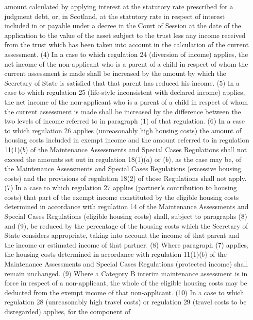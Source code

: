 \documentclass[a4paper]{article}
\begin{document}
amount calculated by applying interest at the statutory rate prescribed for a
judgment debt, or, in Scotland, at the statutory rate in respect of interest
included in or payable under a decree in the Court of Session at the date of the
application to the value of the asset subject to the trust less any income
received from the trust which has been taken into account in the calculation of
the current assessment.
(4) In a case to which regulation 24 (diversion of income) applies, the net
income of the non-applicant who is a parent of a child in respect of whom the
current assessment is made shall be increased by the amount by which the
Secretary of State is satisfied that that parent has reduced his income.
(5) In a case to which regulation 25 (life-style inconsistent with declared
income) applies, the net income of the non-applicant who is a parent of a child
in respect of whom the current assessment is made shall be increased by the
difference between the two levels of income referred to in paragraph (1) of that
regulation.
(6) In a case to which regulation 26 applies (unreasonably high housing costs)
the amount of housing costs included in exempt income and the amount referred to
in regulation 11(1)($b$) of the Maintenance Assessments and Special Cases
Regulations shall not exceed the amounts set out in regulation 18(1)($a$) or ($b$),
as the case may be, of the Maintenance Assessments and Special Cases Regulations
(excessive housing costs) and the provisions of regulation 18(2) of those
Regulations shall not apply.
(7) In a case to which regulation 27 applies (partner’s contribution to housing
costs) that part of the exempt income constituted by the eligible housing costs
determined in accordance with regulation 14 of the Maintenance Assessments and
Special Cases Regulations (eligible housing costs) shall, subject to paragraphs
(8) and (9), be reduced by the percentage of the housing costs which the
Secretary of State considers appropriate, taking into account the income of that
parent and the income or estimated income of that partner.
(8) Where paragraph (7) applies, the housing costs determined in accordance with
regulation 11(1)($b$) of the Maintenance Assessments and Special Cases Regulations
(protected income) shall remain unchanged.
(9) Where a Category B interim maintenance assessment is in force in respect of
a non-applicant, the whole of the eligible housing costs may be deducted from
the exempt income of that non-applicant.
(10) In a case to which regulation 28 (unreasonably high travel costs) or
regulation 29 (travel costs to be disregarded) applies, for the component of
\end{document}
